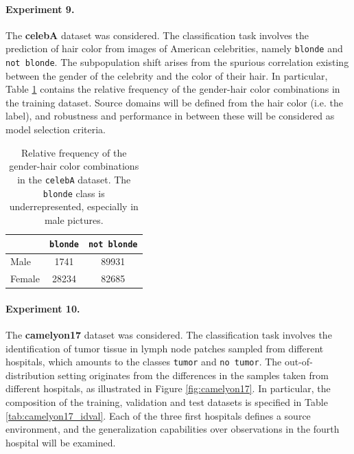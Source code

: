 \paragraph{Experiment 9.} The \textbf{celebA} dataset was considered. The classification task involves the prediction
of hair color from images of American celebrities, namely \texttt{blonde} and \texttt{not blonde}. The subpopulation shift arises from
the spurious correlation existing between the gender of the celebrity and the color of their hair. In particular, 
Table \ref{tab:celebA_freqtable} contains the relative frequency of the gender-hair color combinations in the training dataset. 
Source domains will be defined from the hair color (i.e. the label), and robustness and performance in between
these will be considered as model selection criteria.

\begin{table}[H]
    \centering
    \begin{tabular}{l|c|c}
    & \texttt{blonde} & \texttt{not blonde} \\
    \midrule
    Male   & 1741   & 89931  \\
    Female & 28234   & 82685   \\
    \bottomrule
    \end{tabular}
    \caption{
        Relative frequency of the gender-hair color combinations in the \texttt{celebA} \cite{kohWILDSBenchmarkIntheWild2021} dataset.
        The \texttt{blonde} class is underrepresented, especially in male pictures.
    }
    \label{tab:celebA_freqtable}
\end{table}

\paragraph{Experiment 10.} The \textbf{camelyon17} dataset was considered. The classification task involves the identification of tumor
tissue in lymph node patches sampled from different hospitals, which amounts to the classes \texttt{tumor} and \texttt{no tumor}. 
The out-of-distribution setting originates from the differences in the samples taken from different hospitals, as illustrated in Figure \ref{fig:camelyon17}. 
In particular, the composition of the training, validation and test datasets is specified in Table \ref{tab:camelyon17_idval}.
Each of the three first hospitals defines a source environment, and the generalization capabilities over observations in the fourth hospital will be examined.

